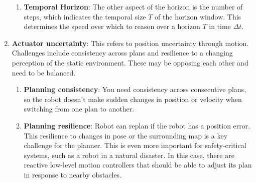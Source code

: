 \documentclass[letterpaper]{article} %
\begin{document}
\begin{enumerate}
\begin{enumerate}
  \item \label{en:issue2b} \textbf{Temporal Horizon}: The other aspect of the horizon is the number of steps, which indicates the temporal size $T$ of the horizon window. This determines the speed over which to reason over a horizon $T$ in time $\Delta t$.
 \end{enumerate}
 \item \textbf{Actuator uncertainty}: This refers to position uncertainty through motion. Challenges include consistency across plans and resilience to a changing perception of the static environment. These may be opposing each other and need to be balanced.
 \begin{enumerate}
  \item \label{en:issue3a} \textbf{Planning consistency}: You need consistency across consecutive plans, so the robot doesn't make sudden changes in position or velocity when switching from one plan to another.
  \item \label{en:issue3b} \textbf{Planning resilience}: Robot can replan if the robot has a position error. This resilience to changes in pose or the surrounding map is a key challenge for the planner. This is even more important for safety-critical systems, such as a robot in a natural disaster. In this case, there are reactive low-level motion controllers that should be able to adjust its plan in response to nearby obstacles.
 \end{enumerate}
\end{enumerate}
\end{document}
